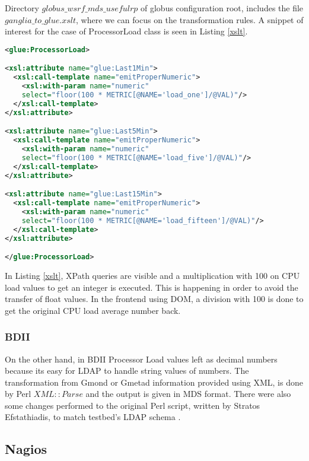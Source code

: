 Directory $globus\_wsrf\_mds\_usefulrp$ of globus configuration root, includes the file $ganglia\_to\_glue.xslt$, where we can focus on the transformation rules. A snippet of interest for the case of ProcessorLoad class is seen in Listing \ref{xslt}.

\begin{lstlisting}[language=XML,caption=WSRF XSLT for Ganglia Information Provider,label=xslt]
<glue:ProcessorLoad>

<xsl:attribute name="glue:Last1Min">
  <xsl:call-template name="emitProperNumeric">
    <xsl:with-param name="numeric" 
    select="floor(100 * METRIC[@NAME='load_one']/@VAL)"/>
  </xsl:call-template>
</xsl:attribute>

<xsl:attribute name="glue:Last5Min">
  <xsl:call-template name="emitProperNumeric">
    <xsl:with-param name="numeric" 
    select="floor(100 * METRIC[@NAME='load_five']/@VAL)"/>
  </xsl:call-template>
</xsl:attribute>

<xsl:attribute name="glue:Last15Min">
  <xsl:call-template name="emitProperNumeric">
    <xsl:with-param name="numeric" 
    select="floor(100 * METRIC[@NAME='load_fifteen']/@VAL)"/>
  </xsl:call-template>
</xsl:attribute>

</glue:ProcessorLoad>
\end{lstlisting}

In Listing \ref{xslt}, XPath queries are visible and a multiplication with 100 on CPU load values to get an integer is executed. This is happening in order to avoid the transfer of float values. In the frontend using DOM, a division with 100 is done to get the original CPU load average number back.

\subsubsection{BDII}

On the other hand, in BDII Processor Load values left as decimal numbers because its easy for LDAP to handle string values of numbers. The transformation from Gmond or Gmetad information provided using XML, is done by Perl $XML::Parse$ and the output is given in MDS format. There were also some changes performed to the original Perl script, written by Stratos Efstathiadis, to match testbed's LDAP schema \cite{stratos_efstathiadis}.

\subsection{Nagios}

